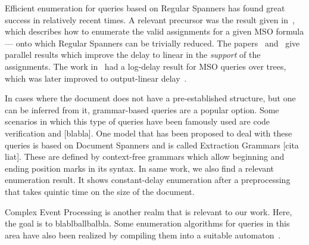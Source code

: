 Efficient enumeration for queries based on Regular Spanners has found great success in relatively recent times. A relevant precursor was the result given in~\cite{bagan2006mso}, which describes how to enumerate the valid assignments for a given MSO formula --- onto which Regular Spanners can be trivially reduced. The papers~\cite{FlorenzanoRUVV20} and~\cite{amarilli2019constant} give parallel results which improve the delay to linear in the {\it support} of the assignments. The work in~\cite{Niewerth18} had a log-delay result for MSO queries over trees, which was later improved to output-linear delay~\cite{amarilli2019enumeration}. 

In cases where the document does not have a pre-established structure, but one can be inferred from it, grammar-based queries are a popular option. Some scenarios in which this type of queries have been famously used are code verification and [blabla]. One model that has been proposed to deal with these queries is based on Document Spanners and is called Extraction Grammars [cita liat]. These are defined by context-free grammars which allow beginning and ending position marks in its syntax. 
In same work, we also find a relevant enumeration result. It shows constant-delay enumeration after a preprocessing that takes quintic time on the size of the document.

Complex Event Processing is another realm that is relevant to our work. Here, the goal is to blablballbalbla. Some enumeration algorithms for queries in this area have also been realized by compiling them into a suitable automaton~\cite{GrezRU19,GrezR20,BucchiGQRV22}.


